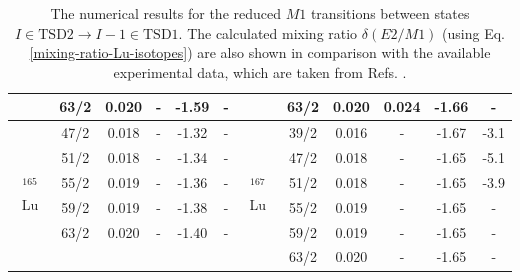 \begin{table}
{\begin{tabular}{|cccccc|cc|cc|cc|}
    \multicolumn{1}{|c|}{} & \multicolumn{1}{c|}{63/2} & \multicolumn{1}{c|}{0.020} & \multicolumn{1}{c|}{-} & \multicolumn{1}{c|}{-1.59} & - & \multicolumn{1}{c|}{} & 63/2 & \multicolumn{1}{c|}{0.020} & 0.024 & \multicolumn{1}{c|}{-1.66} & - \\ \hline
    \multicolumn{1}{|c|}{\multirow{6}{*}{$^{165}$Lu}} & \multicolumn{1}{c|}{47/2} & \multicolumn{1}{c|}{0.018} & \multicolumn{1}{c|}{-} & \multicolumn{1}{c|}{-1.32} & - & \multicolumn{1}{c|}{\multirow{6}{*}{$^{167}$Lu}} & 39/2 & \multicolumn{1}{c|}{0.016} & - & \multicolumn{1}{c|}{-1.67} & -3.1 \\ \cline{2-6} \cline{8-12} 
    \multicolumn{1}{|c|}{} & \multicolumn{1}{c|}{51/2} & \multicolumn{1}{c|}{0.018} & \multicolumn{1}{c|}{-} & \multicolumn{1}{c|}{-1.34} & - & \multicolumn{1}{c|}{} & 47/2 & \multicolumn{1}{c|}{0.018} & - & \multicolumn{1}{c|}{-1.65} & -5.1 \\ \cline{2-6} \cline{8-12} 
    \multicolumn{1}{|c|}{} & \multicolumn{1}{c|}{55/2} & \multicolumn{1}{c|}{0.019} & \multicolumn{1}{c|}{-} & \multicolumn{1}{c|}{-1.36} & - & \multicolumn{1}{c|}{} & 51/2 & \multicolumn{1}{c|}{0.018} & - & \multicolumn{1}{c|}{-1.65} & -3.9 \\ \cline{2-6} \cline{8-12} 
    \multicolumn{1}{|c|}{} & \multicolumn{1}{c|}{59/2} & \multicolumn{1}{c|}{0.019} & \multicolumn{1}{c|}{-} & \multicolumn{1}{c|}{-1.38} & - & \multicolumn{1}{c|}{} & 55/2 & \multicolumn{1}{c|}{0.019} & - & \multicolumn{1}{c|}{-1.65} & - \\ \cline{2-6} \cline{8-12} 
    \multicolumn{1}{|c|}{} & \multicolumn{1}{c|}{63/2} & \multicolumn{1}{c|}{0.020} & \multicolumn{1}{c|}{-} & \multicolumn{1}{c|}{-1.40} & - & \multicolumn{1}{c|}{} & 59/2 & \multicolumn{1}{c|}{0.019} & - & \multicolumn{1}{c|}{-1.65} & - \\ \cline{2-6} \cline{8-12} 
    \multicolumn{1}{|c|}{} & \multicolumn{5}{c|}{} & \multicolumn{1}{c|}{} & 63/2 & \multicolumn{1}{c|}{0.020} & - & \multicolumn{1}{c|}{-1.65} & - \\ \hline
    \end{tabular}%
    }
    \caption{The numerical results for the reduced $M1$ transitions between states $I\in\text{TSD2}\to I-1\in\text{TSD1}$. The calculated mixing ratio $\delta(E2/M1)$ (using Eq. \ref{mixing-ratio-Lu-isotopes}) are also shown in comparison with the available experimental data, which are taken from Refs. \cite{gorgen2004quadrupole,jensen2002wobbling,reich2010nuclear}.}
    \label{table-M1-delta-numerical-results}
\end{table}

